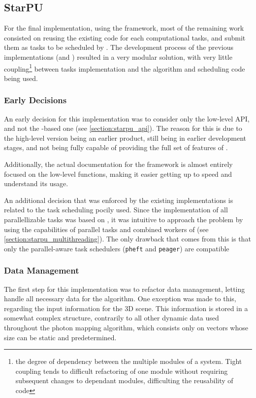 \documentclass[main.tex]{subfiles}
\begin{document}
\subsection{StarPU} \label{section:impl_starpu}

For the final implementation, using the \starpu framework, most of the remaining work consisted on reusing the existing code for each computational tasks, and submit them as tasks to be scheduled by \starpu. The development process of the previous implementations (\cpu and \cuda) resulted in a very modular solution, with very little coupling\footnote{the degree of dependency between the multiple modules of a system. Tight coupling tends to difficult refactoring of one module without requiring subsequent changes to dependant modules, difficulting the reusability of code} between tasks implementation and the algorithm and scheduling code being used.

\subsubsection{Early Decisions}

An early decision for this implementation was to consider only the low-level API, and not the -based one (see \cref{section:starpu_api}). The reason for this is due to the high-level version being an earlier product, still being in earlier development stages, and not being fully capable of providing the full set of features of \starpu.

Additionally, the actual documentation for the framework is almost entirely focused on the low-level functions, making it easier getting up to speed and understand its usage.

An additional decision that was enforced by the existing implementations is related to the task scheduling pocily used. Since the \cpu implementation of all parallellizable tasks was based on \openmp, it was intuitive to approach the problem by using the capabilities of parallel tasks and combined workers of \starpu (see \cref{section:starpu_multithreading}). The only drawback that comes from this is that only the parallel-aware task schedulers (\texttt{pheft} and \texttt{peager}) are compatible

\subsubsection{Data Management}

The first step for this implementation was to refactor data management, letting \starpu handle all necessary data for the algorithm. One exception was made to this, regarding the input information for the 3D scene. This information is stored in a somewhat complex structure, contrarily to all other dynamic data used throughout the photon mapping algorithm, which consists only on vectors whose size can be static and predetermined.
\end{document}
